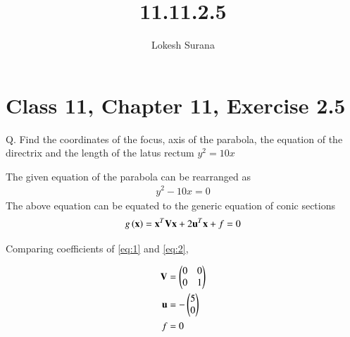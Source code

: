 \documentclass[journal,12pt,twocolumn]{IEEEtran}
\renewcommand{\vec}[1]{\boldsymbol{\mathbf{#1}}}
\begin{document}
\vspace{3cm}
\title{11.11.2.5}
\author{Lokesh Surana}
\maketitle
\section*{Class 11, Chapter 11, Exercise 2.5}

Q. Find the coordinates of the focus, axis of the parabola, the equation of the directrix and the length of the latus rectum $y^2 = 10x$

\solution
The given equation of the parabola can be rearranged as
\begin{align}
    \label{eq:1} y^2-10x = 0
\end{align}
The above equation can be equated to the generic equation of conic sections
\begin{align}
    \label{eq:2} g\brak{\vec{x}} = \vec{x}^T\vec{V}\vec{x} + 2\vec{u}^T\vec{x} + f = 0 
\end{align}

Comparing coefficients of \eqref{eq:1} and \eqref{eq:2},

\begin{align}
    \label{eq:3}
	\vec{V} &= \myvec{ 0 & 0 \\ 0 & 1} \\
	\label{eq:4}
	\vec{u} &= -\myvec{5 \\ 0} \\
	\label{eq:5}
	f &= 0 
\end{align}
\end{document}
